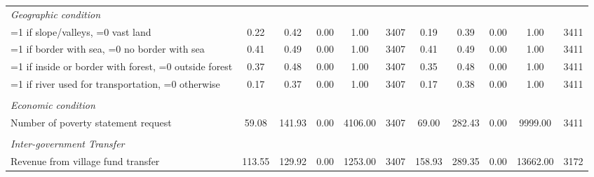 \begin{tabular}{l*{2}{ccccc}}
\\ \emph{Geographic condition}&         &         &         &         &         &         &         &         &         &         \\
\hspace{0.25cm} =1 if slope/valleys, =0 vast land&     0.22&     0.42&     0.00&     1.00&     3407&     0.19&     0.39&     0.00&     1.00&     3411\\
\hspace{0.25cm} =1 if border with sea, =0 no border with sea&     0.41&     0.49&     0.00&     1.00&     3407&     0.41&     0.49&     0.00&     1.00&     3411\\
\hspace{0.25cm} =1 if inside or border with forest, =0 outside forest&     0.37&     0.48&     0.00&     1.00&     3407&     0.35&     0.48&     0.00&     1.00&     3411\\
\hspace{0.25cm} =1 if river used for transportation, =0 otherwise&     0.17&     0.37&     0.00&     1.00&     3407&     0.17&     0.38&     0.00&     1.00&     3411\\
\\ \emph{Economic condition}&         &         &         &         &         &         &         &         &         &         \\
\hspace{0.25cm} Number of poverty statement request&    59.08&   141.93&     0.00&  4106.00&     3407&    69.00&   282.43&     0.00&  9999.00&     3411\\
\\ \emph{Inter-government Transfer}&         &         &         &         &         &         &         &         &         &         \\
\hspace{0.25cm} Revenue from village fund transfer&   113.55&   129.92&     0.00&  1253.00&     3407&   158.93&   289.35&     0.00& 13662.00&     3172\\
\bottomrule
\end{tabular}

